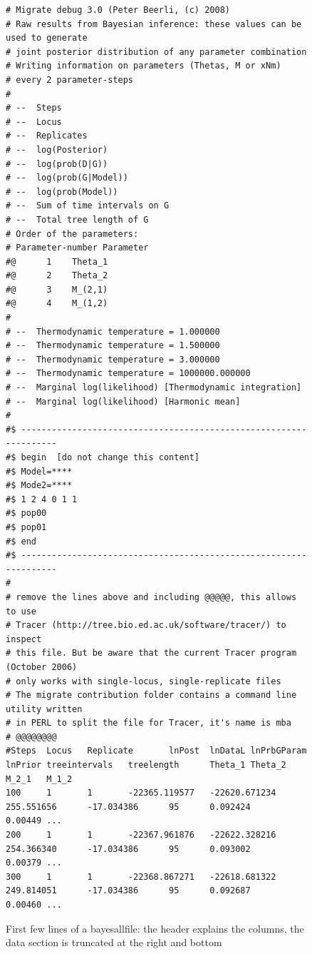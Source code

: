\begin{description}
\begin{figure}[bht]

\begin{center}

\begin{boxedminipage}{6in}
\begin{tiny}
\begin{tt}
\begin{verbatim}
# Migrate debug 3.0 (Peter Beerli, (c) 2008)
# Raw results from Bayesian inference: these values can be used to generate
# joint posterior distribution of any parameter combination
# Writing information on parameters (Thetas, M or xNm)
# every 2 parameter-steps
# 
# --  Steps
# --  Locus
# --  Replicates
# --  log(Posterior)
# --  log(prob(D|G))
# --  log(prob(G|Model))
# --  log(prob(Model))
# --  Sum of time intervals on G
# --  Total tree length of G
# Order of the parameters:
# Parameter-number Parameter
#@      1    Theta_1
#@      2    Theta_2
#@      3    M_(2,1)
#@      4    M_(1,2)
# 
# --  Thermodynamic temperature = 1.000000
# --  Thermodynamic temperature = 1.500000
# --  Thermodynamic temperature = 3.000000
# --  Thermodynamic temperature = 1000000.000000
# --  Marginal log(likelihood) [Thermodynamic integration]
# --  Marginal log(likelihood) [Harmonic mean]
# 
#$ ------------------------------------------------------------------ 
#$ begin  [do not change this content]
#$ Model=****
#$ Mode2=****
#$ 1 2 4 0 1 1
#$ pop00
#$ pop01
#$ end
#$ ------------------------------------------------------------------ 
# 
# remove the lines above and including @@@@@, this allows to use
# Tracer (http://tree.bio.ed.ac.uk/software/tracer/) to inspect
# this file. But be aware that the current Tracer program (October 2006)
# only works with single-locus, single-replicate files
# The migrate contribution folder contains a command line utility written
# in PERL to split the file for Tracer, it's name is mba
# @@@@@@@@
#Steps  Locus   Replicate       lnPost  lnDataL lnPrbGParam     lnPrior treeintervals   treelength      Theta_1 Theta_2 M_2_1   M_1_2
100     1       1       -22365.119577   -22620.671234   255.551656      -17.034386      95      0.092424        0.00449 ...
200     1       1       -22367.961876   -22622.328216   254.366340      -17.034386      95      0.093002        0.00379 ...
300     1       1       -22368.867271   -22618.681322   249.814051      -17.034386      95      0.092687        0.00460 ...
\end{verbatim}
\end{tt}
\end{tiny}
\end{boxedminipage}
\end{center}
\caption{{\sf First few lines of a bayesallfile: the header explains the columns, the data section is truncated at the right and bottom}}
\label{BAYESALLFILE}
\end{figure}


\end{description}
